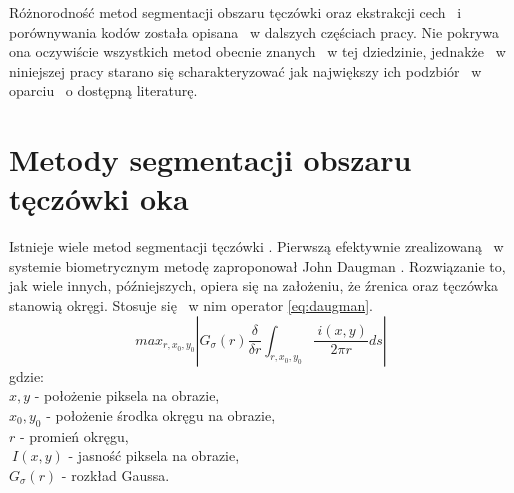 Różnorodność metod segmentacji obszaru tęczówki oraz ekstrakcji cech ~i porównywania kodów została opisana ~w dalszych częściach pracy. Nie pokrywa ona oczywiście wszystkich metod obecnie znanych ~w tej dziedzinie, jednakże ~w niniejszej pracy starano się scharakteryzować jak największy ich podzbiór ~w oparciu ~o dostępną literaturę.


\section{Metody segmentacji obszaru tęczówki oka}
\label{sec:segmentacja}

Istnieje wiele metod segmentacji tęczówki \cite{PrAl06}. Pierwszą efektywnie zrealizowaną ~w systemie biometrycznym metodę zaproponował John Daugman \cite{Daugman}. Rozwiązanie to, jak wiele innych, późniejszych, opiera się na założeniu, że źrenica oraz tęczówka stanowią okręgi. Stosuje się ~w nim operator \ref{eq:daugman}.
\begin{equation}
\label{eq:daugman}
max_{r,x_{0},y_{0}}\left| G_{\sigma}(r) \frac{\delta}{\delta r}\int_{r,x_{0},y_{0}} \frac{~i(x,y)}{2\pi r}ds \right|
\end{equation}
gdzie:\\
$ x,y $ - położenie piksela na obrazie, \\
$ x_{0}, y_{0} $ - położenie środka okręgu na obrazie, \\
$ r $ - promień okręgu, \\
$ ~I(x,y) $ - jasność piksela na obrazie,\\
$ G_{\sigma}(r) $ - rozkład Gaussa.

